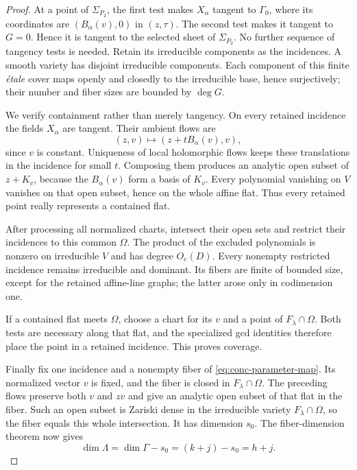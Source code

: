 \begin{proof}
At a point of $\Sigma_{P_2}$, the first test makes $X_\alpha$ tangent to $\Gamma_0$, where its coordinates are $(B_\alpha(v),0)$ in $(z,\tau)$.  The second test makes it tangent to $G=0$.  Hence it is tangent to the selected sheet of $\Sigma_{P_2}$.  No further sequence of tangency tests is needed.  Retain its irreducible components as the incidences.  A smooth variety has disjoint irreducible components.  Each component of this finite \emph{\'etale} cover maps openly and closedly to the irreducible base, hence surjectively; their number and fiber sizes are bounded by $\deg G$.

We verify containment rather than merely tangency.  On every retained incidence the fields $X_\alpha$ are tangent.  Their ambient flows are
\[
 (z,v)\longmapsto(z+tB_\alpha(v),v),
\]
since $v$ is constant.  Uniqueness of local holomorphic flows keeps these translations in the incidence for small $t$.  Composing them produces an analytic open subset of $z+K_v$, because the $B_\alpha(v)$ form a basis of $K_v$.  Every polynomial vanishing on $V$ vanishes on that open subset, hence on the whole affine flat.  Thus every retained point really represents a contained flat.

After processing all normalized charts, intersect their open sets and restrict their incidences to this common $\Omega$.  The product of the excluded polynomials is nonzero on irreducible $V$ and has degree $O_e(D)$.  Every nonempty restricted incidence remains irreducible and dominant.  Its fibers are finite of bounded size, except for the retained affine-line graphs; the latter arose only in codimension one.

If a contained flat meets $\Omega$, choose a chart for its $v$ and a point of $F_\lambda\cap\Omega$.  Both tests are necessary along that flat, and the specialized gcd identities therefore place the point in a retained incidence.  This proves coverage.

Finally fix one incidence and a nonempty fiber of \eqref{eq:conc-parameter-map}.  Its normalized vector $v$ is fixed, and the fiber is closed in $F_\lambda\cap\Omega$.  The preceding flows preserve both $v$ and $zv$ and give an analytic open subset of that flat in the fiber.  Such an open subset is Zariski dense in the irreducible variety $F_\lambda\cap\Omega$, so the fiber equals this whole intersection.  It has dimension $s_0$.  The fiber-dimension theorem now gives
\[
 \dim\Lambda=\dim\Gamma-s_0=(k+j)-s_0=h+j.
\]
\end{proof}

